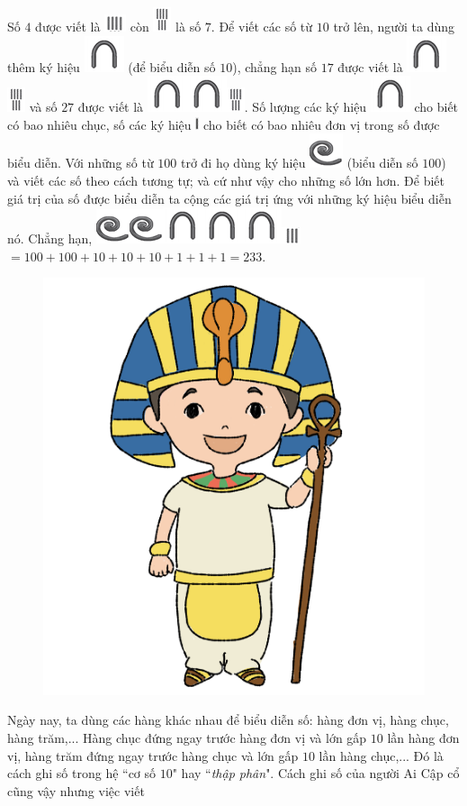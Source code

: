 	\begin{multicols}{2}
	Số $4$ được viết là \includegraphics[scale=0.85]{3} còn \includegraphics{4}  là số $7$. Để viết các số từ $10$ trở lên, người ta dùng thêm ký hiệu \includegraphics[scale=0.85]{5} (để biểu diễn số $10$), chẳng hạn số $17$ được viết là \includegraphics[scale=0.85]{5}\includegraphics[scale=0.85]{4} và số $27$ được viết là  \includegraphics[scale=0.85]{5}\includegraphics[scale=0.85]{5}\includegraphics[scale=0.85]{4}. Số lượng các ký hiệu \includegraphics[scale=0.85]{5} cho biết có bao nhiêu chục, số các ký hiệu \includegraphics[scale=1]{12} cho biết có bao nhiêu đơn vị trong số được biểu diễn. Với những số từ $100$ trở đi họ dùng ký hiệu \includegraphics[scale=0.85]{6} (biểu diễn số $100$) và viết các số theo cách tương tự; và cứ như vậy cho những số lớn hơn. Để biết giá trị của số được biểu diễn ta cộng các giá trị ứng với những ký hiệu biểu diễn nó. Chẳng hạn, \includegraphics[scale=0.85]{6}\includegraphics[scale=0.85]{6}\includegraphics[scale=0.85]{5}\includegraphics[scale=0.85]{5}\includegraphics[scale=0.85]{5}\includegraphics[scale=0.85]{3.1}   $=  100+ 100 + 10 + 10 + 10 + 1 + 1 + 1= 233$.
	\vskip 0.1cm
	\begin{figure}[H]
		\centering
		\vspace*{-5pt}
		\captionsetup{labelformat= empty, justification=centering}
		\includegraphics[width=0.85\linewidth]{20.12-pi.1}
		\vspace*{-15pt}
	\end{figure}
	Ngày nay, ta dùng các hàng khác nhau để biểu diễn số: hàng đơn vị, hàng chục, hàng trăm,... Hàng chục đứng ngay trước hàng đơn vị và lớn gấp $10$ lần hàng đơn vị, hàng trăm đứng ngay trước hàng chục và lớn gấp $10$ lần hàng chục,... Đó là cách ghi số trong hệ ``cơ số $10$" hay ``\textit{thập phân}". Cách ghi số của người Ai Cập cổ cũng vậy nhưng việc viết 
\end{multicols}
